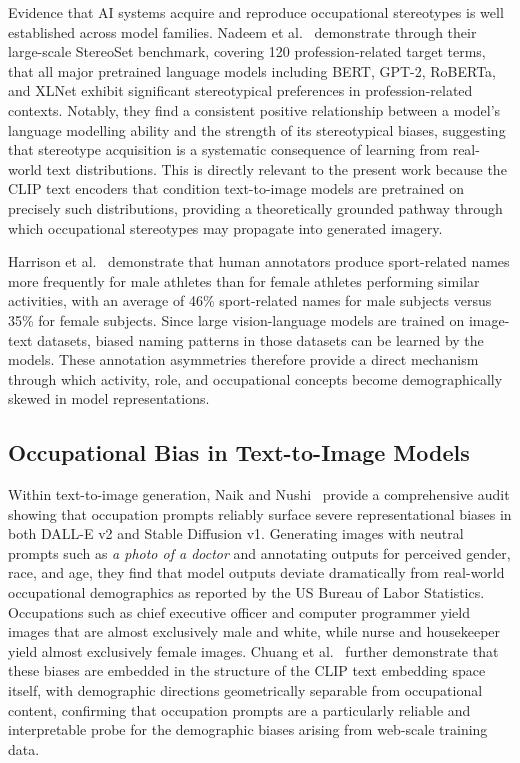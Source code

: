 Evidence that AI systems acquire and reproduce occupational stereotypes is well established across model families. Nadeem et al.~\cite{Nadeem_2020_StereoSet} demonstrate through their large-scale StereoSet benchmark, covering 120 profession-related target terms, that all major pretrained language models including BERT, GPT-2, RoBERTa, and XLNet exhibit significant stereotypical preferences in profession-related contexts. Notably, they find a consistent positive relationship between a model's language modelling ability and the strength of its stereotypical biases, suggesting that stereotype acquisition is a systematic consequence of learning from real-world text distributions. This is directly relevant to the present work because the CLIP text encoders that condition text-to-image models are pretrained on precisely such distributions, providing a theoretically grounded pathway through which occupational stereotypes may propagate into generated imagery.

Harrison et al.~\cite{Harrison_2023_RunLikeAGirl} demonstrate that human annotators produce sport-related names more frequently for male athletes than for female athletes performing similar activities, with an average of 46\% sport-related names for male subjects versus 35\% for female subjects. Since large vision-language models are trained on image-text datasets, biased naming patterns in those datasets can be learned by the models. These annotation asymmetries therefore provide a direct mechanism through which activity, role, and occupational concepts become demographically skewed in model representations.

\subsection{Occupational Bias in Text-to-Image Models}
\label{subsubsec:naik_occupations}

Within text-to-image generation, Naik and Nushi~\cite{Naik_2023_SocialBiasesThroughTheTextToImageGenerationLens} provide a comprehensive audit showing that occupation prompts reliably surface severe representational biases in both DALL-E v2 and Stable Diffusion v1. Generating images with neutral prompts such as \textit{a photo of a doctor} and annotating outputs for perceived gender, race, and age, they find that model outputs deviate dramatically from real-world occupational demographics as reported by the US Bureau of Labor Statistics. Occupations such as chief executive officer and computer programmer yield images that are almost exclusively male and white, while nurse and housekeeper yield almost exclusively female images. Chuang et al.~\cite{Chuang_2023_DebiasingVisionLanguageModelsViaBiasedPrompts} further demonstrate that these biases are embedded in the structure of the CLIP text embedding space itself, with demographic directions geometrically separable from occupational content, confirming that occupation prompts are a particularly reliable and interpretable probe for the demographic biases arising from web-scale training data.


